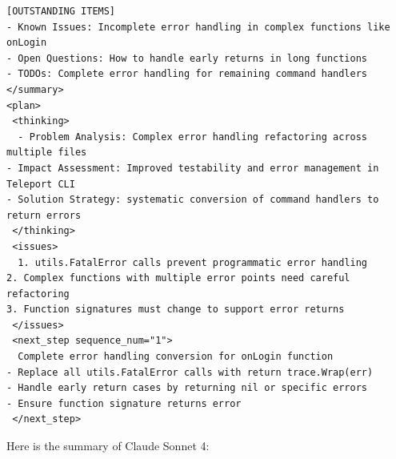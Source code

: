 \begin{tcolorbox}
\begin{verbatim}
[OUTSTANDING ITEMS]
- Known Issues: Incomplete error handling in complex functions like onLogin
- Open Questions: How to handle early returns in long functions
- TODOs: Complete error handling for remaining command handlers
</summary>
<plan>
 <thinking>
  - Problem Analysis: Complex error handling refactoring across multiple files
- Impact Assessment: Improved testability and error management in Teleport CLI
- Solution Strategy: systematic conversion of command handlers to return errors
 </thinking>
 <issues>
  1. utils.FatalError calls prevent programmatic error handling
2. Complex functions with multiple error points need careful refactoring
3. Function signatures must change to support error returns
 </issues>
 <next_step sequence_num="1">
  Complete error handling conversion for onLogin function
- Replace all utils.FatalError calls with return trace.Wrap(err)
- Handle early return cases by returning nil or specific errors
- Ensure function signature returns error
 </next_step>
\end{verbatim}
\end{tcolorbox}
Here is the summary of Claude Sonnet 4:
